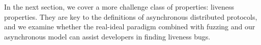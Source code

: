 In the next section, we cover a more challenge class of properties: liveness properties.
They are key to the definitions of asynchronous distributed protocols, and we examine whether the real-ideal paradigm combined with fuzzing and our asynchronous model can assist developers in finding liveness bugs.

%
%
%
%
%
%
%
